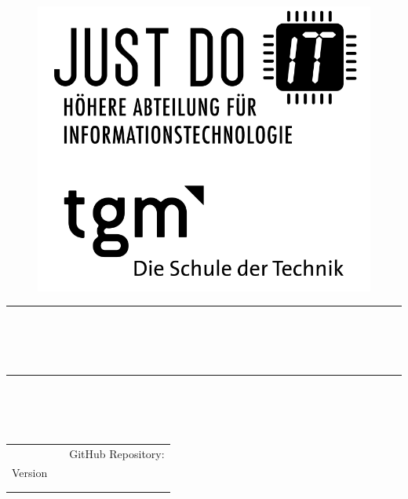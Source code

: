 
\begin{titlepage}

	\begin{figure}[!h]
		\begin{flushright}
			\includegraphics[width=0.3\linewidth]{images/jdIT_tgm.png}
		\end{flushright}
	\end{figure}

	\vspace{1cm} 

	{\begin{center} \bfseries\huge
			\rule{17.5cm}{0.1mm}  
			\\[5mm]
			\mytitle\\[5mm]
			\mythema\\
			\rule{17.5cm}{0.1mm}  
	\end{center}}

	{\begin{flushright} \bfseries\Large
			\vspace{1.8cm}
			\mysubject\\
			\mycourse\\[9mm]
			\myauthor\\[9mm]
	\end{flushright}}

	{\begin{table}[!h] \bfseries\normalsize
		\begin{tabularx}{\textwidth}{lXr @{\hspace{0mm}}}
			&& GitHub Repository: \cite{myRepo}\\
			Version \myversion\\
			\mygrade && \mybegin\\
			\myteacher && \myfinish\\
		\end{tabularx}
	\end{table}}

\end{titlepage}

